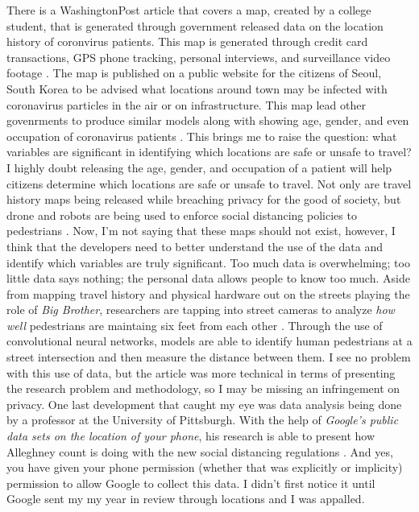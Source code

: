 \documentclass[12pt]{article}
\begin{document}
There is a
WashingtonPost article that covers a map, created by a college student, that is generated through government released data on the location history of coronvirus patients. This map is generated through 
credit card transactions, GPS phone tracking, personal interviews, and surveillance video footage \cite{kim_denyer_2020}. The map is published on a public website for the citizens of Seoul, South Korea to be advised what locations around town
may be infected with coronavirus particles in the air or on infrastructure. This map lead other govenrments to produce similar models along with showing age, gender, and even occupation of coronavirus patients \cite{kim_denyer_2020}. 
This brings me to raise the question: what variables are significant in identifying which locations are safe or unsafe to travel? I highly doubt releasing the age, gender, and occupation of a patient will help citizens determine which locations
are safe or unsafe to travel. Not only are travel history maps being released while breaching privacy for the good of society, but drone and robots are being used to enforce social distancing policies to pedestrians \cite{kim_denyer_2020, shenker_2020}. Now,
I'm not saying that these maps should not exist, however, I think that the developers need to better understand the use of the data and identify which variables are truly significant. Too much data is overwhelming; too little data says nothing; the personal data
allows people to know too much. Aside from mapping travel history and physical hardware out on the streets playing the role of \textit{Big Brother}, researchers are tapping into street cameras to analyze \textit{how well} pedestrians are maintaing six feet from
each other \cite{das_james_2020}. Through the use of convolutional neural networks, models are able to identify human pedestrians at a street intersection and then measure the distance between them. I see no problem with this use of data, but the article was more technical in terms of 
presenting the research problem and methodology, so I may be missing an infringement on privacy. One last development that caught my eye was data analysis being done by a professor at the University of Pittsburgh. With the help of \textit{Google's public data sets on
the location of your phone}, his research is able to present how Alleghney count is doing with the new social distancing regulations \cite{gazette_2020, kaplan_2020}. And yes, you have given your phone permission (whether that was explicitly or implicity) permission to allow Google to 
collect this data. I didn't first notice it until Google sent my my year in review through locations and I was appalled. 
\end{document}
